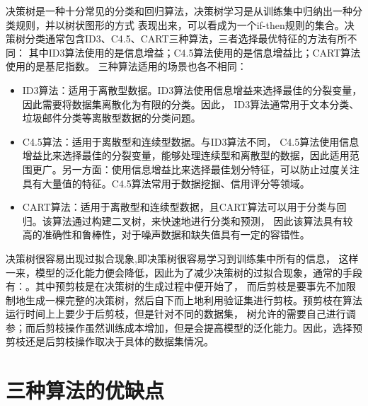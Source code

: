 \documentclass{SHUarticle}
\title{\heiti{决策树分类算法总结}}
\date{\today}
\begin{document}
	\maketitle
	\begin{cnabstract}
		决策树是一种十分常见的分类和回归算法，决策树学习是从训练集中归纳出一种分类规则，并以树状图形的方式
		表现出来，可以看成为一个if-then规则的集合。决策树分类通常包含ID3、C4.5、CART三种算法，三者选择最优特征的方法有所不同：
		其中ID3算法使用的是信息增益；C4.5算法使用的是信息增益比；CART算法使用的是基尼指数。
		三种算法适用的场景也各不相同：
		\begin{itemize}
			\item ID3算法：适用于离散型数据。ID3算法使用信息增益来选择最佳的分裂变量，
			因此需要将数据集离散化为有限的分类。因此，
			ID3算法通常用于文本分类、垃圾邮件分类等离散型数据的分类问题。
			\item C4.5算法：适用于离散型和连续型数据。与ID3算法不同，
			C4.5算法使用信息增益比来选择最佳的分裂变量，能够处理连续型和离散型的数据，因此适用范围更广。另一方面：使用信息增益比来选择最佳划分特征，可以防止过度关注具有大量值的特征。C4.5算法常用于数据挖掘、信用评分等领域。
			\item  CART算法：适用于离散型和连续型数据，且CART算法可以用于分类与回归。该算法通过构建二叉树，来快速地进行分类和预测，
			因此该算法具有较高的准确性和鲁棒性，对于噪声数据和缺失值具有一定的容错性。
		\end{itemize}
		\par
		决策树很容易出现过拟合现象,即决策树很容易学习到训练集中所有的信息，
		这样一来，模型的泛化能力便会降低，因此为了减少决策树的过拟合现象，通常的手段有：{}。其中预剪枝是在决策树的生成过程中便开始了，
		而后剪枝是要事先不加限制地生成一棵完整的决策树，然后自下而上地利用验证集进行剪枝。预剪枝在算法运行时间上上要少于后剪枝，但是针对不同的数据集，
		树允许的{}需要自己进行调参；而后剪枝操作虽然训练成本增加，但是会提高模型的泛化能力。因此，选择预剪枝还是后剪枝操作取决于具体的数据集情况。
	\end{cnabstract}
	\tableofcontents %
	\newpage
\section{三种算法的优缺点}
\end{document}
